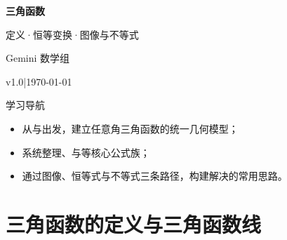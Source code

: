 \documentclass[a4paper,11pt]{ctexart}
\renewcommand{\notetitle}{三角函数}
\renewcommand{\noteauthor}{Gemini 数学组}
\renewcommand{\notedate}{\today}
\renewcommand{\notesubtitle}{定义·恒等变换·图像与不等式}
\renewcommand{\noteversion}{v1.0}
\begin{document}
\MathNoteEnablePrint

\thispagestyle{empty}
\setcounter{page}{1}

\noindent
\begin{minipage}[t][0.7\textheight][c]{\textwidth}
  \raggedleft
  \vspace*{\fill}
  {\sffamily\bfseries\Huge\color{accent}\notetitle\par}
  \vspace{0.6em}
  {\Large\color{inkgray}\notesubtitle\par}
  \vspace{0.5em}
  {\large\color{inkgray}\noteauthor\par}
  \vspace{0.4em}
  {\normalsize\color{inkgray}\noteversion\quad|\quad\notedate\par}
  \vspace*{\fill}
\end{minipage}

\begin{center}
\begin{minipage}{0.84\textwidth}
  \textcolor{inkgray}{\sffamily\small 学习导航}\\
  \begin{itemize}
    \item 从与出发，建立任意角三角函数的统一几何模型；
    \item 系统整理、与等核心公式族；
    \item 通过图像、恒等式与不等式三条路径，构建解决的常用思路。
  \end{itemize}
\end{minipage}
\end{center}
\vspace{1em}



\clearpage
\thispagestyle{plain}
\tableofcontents
\begin{roadmap}
\end{roadmap}
\newpage

\section{三角函数的定义与三角函数线}
\end{document}

